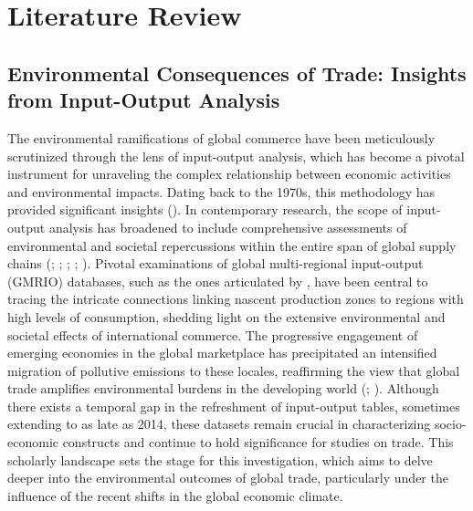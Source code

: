 \chapter{Literature Review}
\label{chap:LITERATURE REVIEW}

\section{Environmental Consequences of Trade: Insights from Input-Output Analysis}
The environmental ramifications of global commerce have been meticulously scrutinized through the lens of input-output analysis, which has become a pivotal instrument for unraveling the complex relationship between economic activities and environmental impacts. Dating back to the 1970s, this methodology has provided significant insights (). In contemporary research, the scope of input-output analysis has broadened to include comprehensive assessments of environmental and societal repercussions within the entire span of global supply chains (; ; ; ; ). Pivotal examinations of global multi-regional input-output (GMRIO) databases, such as the ones articulated by , have been central to tracing the intricate connections linking nascent production zones to regions with high levels of consumption, shedding light on the extensive environmental and societal effects of international commerce. The progressive engagement of emerging economies in the global marketplace has precipitated an intensified migration of pollutive emissions to these locales, reaffirming the view that global trade amplifies environmental burdens in the developing world (; ). Although there exists a temporal gap in the refreshment of input-output tables, sometimes extending to as late as 2014, these datasets remain crucial in characterizing socio-economic constructs and continue to hold significance for studies on trade. This scholarly landscape sets the stage for this investigation, which aims to delve deeper into the environmental outcomes of global trade, particularly under the influence of the recent shifts in the global economic climate.

